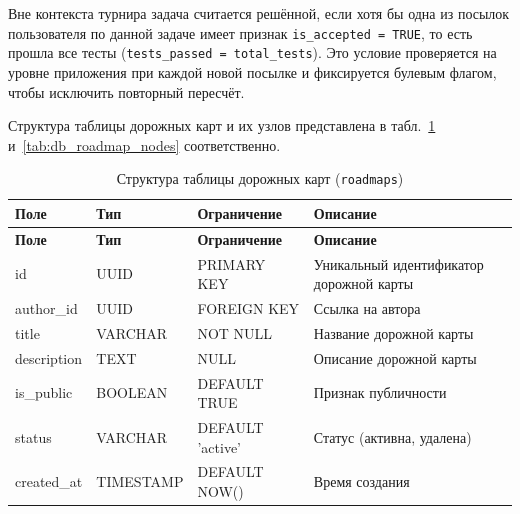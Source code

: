 Вне контекста турнира задача считается решённой, если хотя бы одна из посылок
пользователя по данной задаче имеет признак \texttt{is\_accepted = TRUE}, то есть
прошла все тесты (\texttt{tests\_passed = total\_tests}). Это условие проверяется
на уровне приложения при каждой новой посылке и фиксируется булевым флагом,
чтобы исключить повторный пересчёт.

Структура таблицы дорожных карт и их узлов представлена
в табл.~\ref{tab:db_roadmaps} и~\ref{tab:db_roadmap_nodes} соответственно.

\begin{longtable}{|l|l|p{3.5cm}|p{5.5cm}|}
	\caption{Структура таблицы дорожных карт (\texttt{roadmaps})} \label{tab:db_roadmaps} \\

	\hline
	\textbf{Поле}  & \textbf{Тип} & \textbf{Ограничение} & \textbf{Описание}                        \\ \hline
	\endfirsthead

	\tabcont{\ref{tab:db_roadmaps}}
	\textbf{Поле}  & \textbf{Тип} & \textbf{Ограничение} & \textbf{Описание}                        \\ \hline
	\endhead

	\hline
	\endfoot

	\hline
	\endlastfoot

	id             & UUID         & PRIMARY KEY          & Уникальный идентификатор дорожной карты  \\ \hline
	author\_id     & UUID         & FOREIGN KEY          & Ссылка на автора                         \\ \hline
	title          & VARCHAR      & NOT NULL             & Название дорожной карты                  \\ \hline
	description    & TEXT         & NULL                 & Описание дорожной карты                  \\ \hline
	is\_public     & BOOLEAN      & DEFAULT TRUE         & Признак публичности                      \\ \hline
	status         & VARCHAR      & DEFAULT 'active'     & Статус (активна, удалена)                \\ \hline
	created\_at    & TIMESTAMP    & DEFAULT NOW()        & Время создания                           \\ \hline
\end{longtable}


